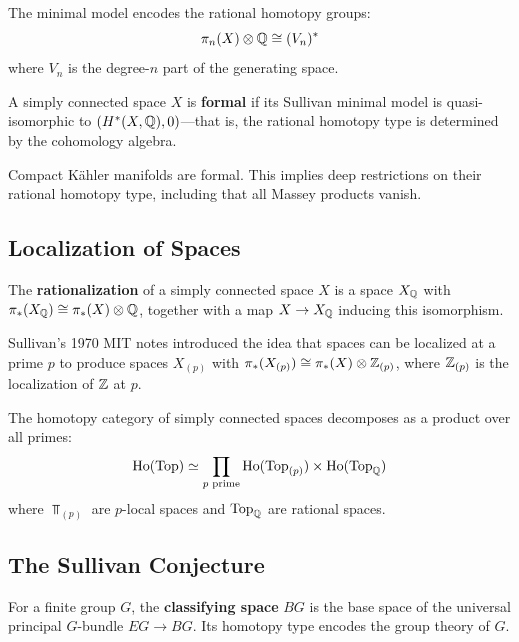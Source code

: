 The minimal model encodes the rational homotopy groups:
\[
\pi_n(X) \otimes \mathbb{Q} \cong (V_n)^*
\]
where $V_n$ is the degree-$n$ part of the generating space.

\begin{definition}
A simply connected space $X$ is \textbf{formal} if its Sullivan minimal model is quasi-isomorphic to $(H^*(X, \mathbb{Q}), 0)$---that is, the rational homotopy type is determined by the cohomology algebra.
\end{definition}

\begin{theorem}
Compact K\"ahler manifolds are formal. This implies deep restrictions on their rational homotopy type, including that all Massey products vanish.
\end{theorem}

\subsection{Localization of Spaces}

\begin{definition}[Rationalization]
The \textbf{rationalization} of a simply connected space $X$ is a space $X_{\mathbb{Q}}$ with $\pi_*(X_{\mathbb{Q}}) \cong \pi_*(X) \otimes \mathbb{Q}$, together with a map $X \to X_{\mathbb{Q}}$ inducing this isomorphism.
\end{definition}

Sullivan's 1970 MIT notes introduced the idea that spaces can be localized at a prime $p$ to produce spaces $X_{(p)}$ with $\pi_*(X_{(p)}) \cong \pi_*(X) \otimes \mathbb{Z}_{(p)}$, where $\mathbb{Z}_{(p)}$ is the localization of $\mathbb{Z}$ at $p$.

\begin{theorem}
The homotopy category of simply connected spaces decomposes as a product over all primes:
\[
\operatorname{Ho}(\operatorname{Top}) \simeq \prod_{p \text{ prime}} \operatorname{Ho}(\operatorname{Top}_{(p)}) \times \operatorname{Ho}(\operatorname{Top}_{\mathbb{Q}})
\]
where $\Top_{(p)}$ are $p$-local spaces and $\operatorname{Top}_{\mathbb{Q}}$ are rational spaces.
\end{theorem}

\subsection{The Sullivan Conjecture}

\begin{definition}
For a finite group $G$, the \textbf{classifying space} $BG$ is the base space of the universal principal $G$-bundle $EG \to BG$. Its homotopy type encodes the group theory of $G$.
\end{definition}

